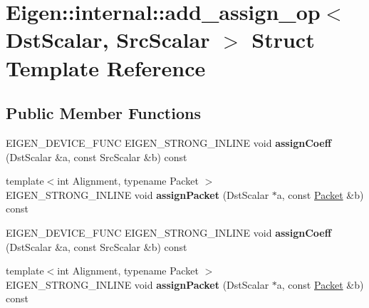 \hypertarget{struct_eigen_1_1internal_1_1add__assign__op}{}\section{Eigen\+:\+:internal\+:\+:add\+\_\+assign\+\_\+op$<$ Dst\+Scalar, Src\+Scalar $>$ Struct Template Reference}
\label{struct_eigen_1_1internal_1_1add__assign__op}
\subsection*{Public Member Functions}
\begin{DoxyCompactItemize}
\item 
\mbox{\label{struct_eigen_1_1internal_1_1add__assign__op_a94b49e5951ce3c543def36b10c7700ac}} 
E\+I\+G\+E\+N\+\_\+\+D\+E\+V\+I\+C\+E\+\_\+\+F\+U\+NC E\+I\+G\+E\+N\+\_\+\+S\+T\+R\+O\+N\+G\+\_\+\+I\+N\+L\+I\+NE void {\bfseries assign\+Coeff} (Dst\+Scalar \&a, const Src\+Scalar \&b) const
\item 
\mbox{\label{struct_eigen_1_1internal_1_1add__assign__op_a2f340fd488f744d8487083b4d51fd350}} 
{\footnotesize template$<$int Alignment, typename Packet $>$ }\\E\+I\+G\+E\+N\+\_\+\+S\+T\+R\+O\+N\+G\+\_\+\+I\+N\+L\+I\+NE void {\bfseries assign\+Packet} (Dst\+Scalar $\ast$a, const \hyperlink{union_eigen_1_1internal_1_1_packet}{Packet} \&b) const
\item 
\mbox{\label{struct_eigen_1_1internal_1_1add__assign__op_a94b49e5951ce3c543def36b10c7700ac}} 
E\+I\+G\+E\+N\+\_\+\+D\+E\+V\+I\+C\+E\+\_\+\+F\+U\+NC E\+I\+G\+E\+N\+\_\+\+S\+T\+R\+O\+N\+G\+\_\+\+I\+N\+L\+I\+NE void {\bfseries assign\+Coeff} (Dst\+Scalar \&a, const Src\+Scalar \&b) const
\item 
\mbox{\label{struct_eigen_1_1internal_1_1add__assign__op_a2f340fd488f744d8487083b4d51fd350}} 
{\footnotesize template$<$int Alignment, typename Packet $>$ }\\E\+I\+G\+E\+N\+\_\+\+S\+T\+R\+O\+N\+G\+\_\+\+I\+N\+L\+I\+NE void {\bfseries assign\+Packet} (Dst\+Scalar $\ast$a, const \hyperlink{union_eigen_1_1internal_1_1_packet}{Packet} \&b) const
\end{DoxyCompactItemize}


